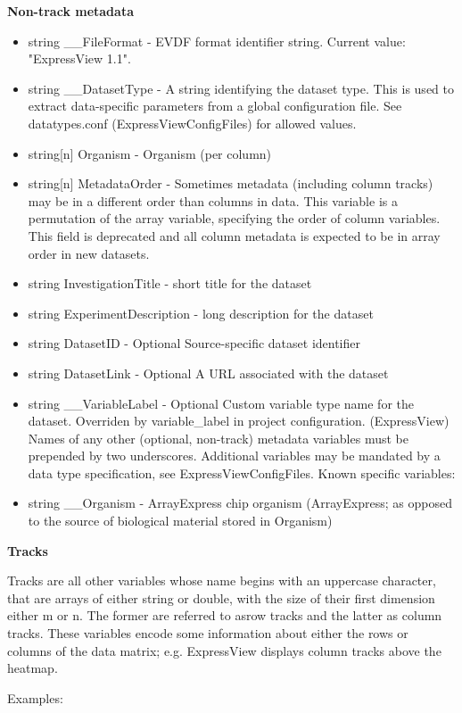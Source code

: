 \documentclass[12pt]{article}
\begin{document}
\textbf{Non-track metadata}
\begin{itemize}
  \item string \_\_FileFormat - EVDF format identifier string. Current value: "ExpressView 1.1".
  \item string \_\_DatasetType - A string identifying the dataset type. This is used to extract data-specific parameters from a global configuration file. See datatypes.conf (ExpressViewConfigFiles) for allowed values.
  \item string[n] Organism - Organism (per column)
  \item string[n] MetadataOrder - Sometimes metadata (including column tracks) may be in a different order than columns in data. This variable is a permutation of the array variable, specifying the order of column variables. This field is deprecated and all column metadata is expected to be in array order in new datasets.
  \item string InvestigationTitle - short title for the dataset
  \item string ExperimentDescription - long description for the dataset
  \item string DatasetID - Optional Source-specific dataset identifier
  \item string DatasetLink - Optional A URL associated with the dataset
  \item string \_\_VariableLabel - Optional Custom variable type name for the dataset. Overriden by variable\_label in project configuration. (ExpressView)
Names of any other (optional, non-track) metadata variables must be prepended by two underscores. Additional variables may be mandated by a data type specification, see ExpressViewConfigFiles. Known specific variables:
  \item string \_\_Organism - ArrayExpress chip organism (ArrayExpress; as opposed to the source of biological material stored in Organism)
\end{itemize}

\textbf{Tracks}

Tracks are all other variables whose name begins with an uppercase character, that are arrays of either string or double, with the size of their first dimension either m or n. The former are referred to asrow tracks and the latter as column tracks. These variables encode some information about either the rows or columns of the data matrix; e.g. ExpressView displays column tracks above the heatmap.

Examples:
\end{document}
